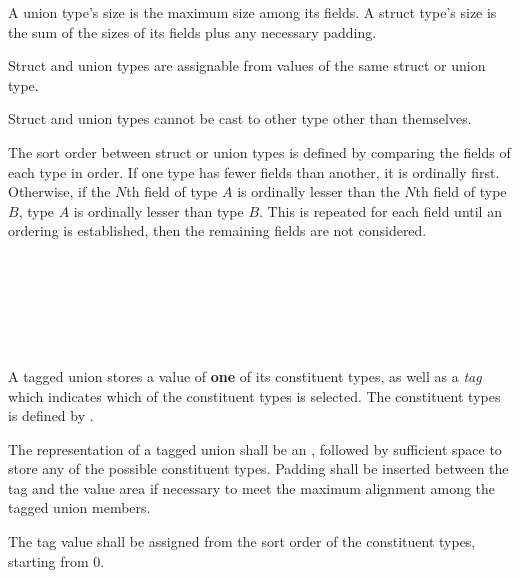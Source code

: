 \specsubsubitem
A union type's size is the maximum size among its fields. A struct type's size
is the sum of the sizes of its fields plus any necessary padding.

\specsubsubitem
Struct and union types are assignable from values of the same struct or union
type.


\specsubsubitem
Struct and union types cannot be cast to other type other than themselves.

\specsubsubitem
The sort order between struct or union types is defined by comparing the fields
of each type in order. If one type has fewer fields than another, it is
ordinally first. Otherwise, if the $N$th field of type $A$ is ordinally lesser
than the $N$th field of type $B$, type $A$ is ordinally lesser than type $B$.
This is repeated for each field until an ordering is established, then the
remaining fields are not considered.


\begin{grammar}
 \\
	\terminal{(}  \terminal{)} \\

 \\
	 \terminal{|}  \\
	 \terminal{|}  \\
\end{grammar}

\specsubsubitem
A tagged union stores a value of \textbf{one} of its constituent types, as well
as a \textit{tag} which indicates which of the constituent types is selected.
The constituent types is defined by .

\specsubsubitem
The representation of a tagged union shall be an , followed by
sufficient space to store any of the possible constituent types. Padding shall
be inserted between the tag and the value area if necessary to meet the maximum
alignment among the tagged union members.

\specsubsubitem
The tag value shall be assigned from the sort order of the constituent types,
starting from $0$.


